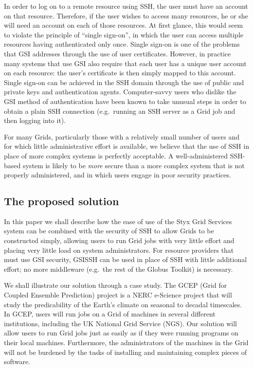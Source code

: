 \documentclass[a4paper]{article}
\begin{document}
\begin{multicols}{2}
In order to log on to a remote resource using SSH, the user must have an account on that resource.  Therefore, if the user wishes to access many resources, he or she will need an account on each of those resources.  At first glance, this would seem to violate the principle of ``single sign-on'', in which the user can access multiple resources having authenticated only once.  Single sign-on is one of the problems that GSI addresses through the use of user certificates.  However, in practice many systems that use GSI also require that each user has a unique user account on each resource: the user's certificate is then simply mapped to this account.  Single sign-on can be achieved in the SSH domain through the use of public and private keys and authentication agents.  Computer-savvy users who dislike the GSI method of authentication have been known to take unusual steps in order to obtain a plain SSH connection (e.g.\ running an SSH server as a Grid job and then logging into it).

For many Grids, particularly those with a relatively small number of users and for which little administrative effort is available, we believe that the use of SSH in place of more complex systems is perfectly acceptable.  A well-administered SSH-based system is likely to be {\em more\/} secure than a more complex system that is not properly administered, and in which users engage in poor security practices.

\subsection{The proposed solution}
In this paper we shall describe how the ease of use of the Styx Grid Services system can be combined with the security of SSH to allow Grids to be constructed simply, allowing users to run Grid jobs with very little effort and placing very little load on system administrators.  For resource providers that must use GSI security, GSISSH can be used in place of SSH with little additional effort; no more middleware (e.g.\ the rest of the Globus Toolkit) is necessary.

We shall illustrate our solution through a case study.  The GCEP (Grid for Coupled Ensemble Prediction) project is a NERC e-Science project that will study the predicability of the Earth's climate on seasonal to decadal timescales.  In GCEP, users will run jobs on a Grid of machines in several different institutions, including the UK National Grid Service (NGS).  Our solution will allow users to run Grid jobs just as easily as if they were running programs on their local machines.  Furthermore, the administrators of the machines in the Grid will not be burdened by the tasks of installing and maintaining complex pieces of software.



\end{multicols}
\end{document}
